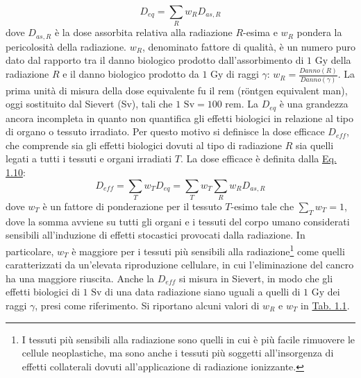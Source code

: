 \documentclass[12pt,a4paper,twoside]{report}
\begin{document}
	\begin{equation}
		D_{eq}=\sum_{R}w_RD_{as,R}
		\label{eq:dose_eq}
	\end{equation}
	dove $D_{as,R}$ è la dose assorbita relativa alla radiazione $R$-esima e $w_R$ pondera la pericolosità della radiazione. $w_R$, denominato fattore di qualità, è un numero puro dato dal rapporto tra il danno biologico prodotto dall'assorbimento di $1\mbox{ Gy}$ della radiazione $R$ e il danno biologico prodotto da $1\mbox{ Gy}$ di raggi $\gamma$: $w_R=\frac{Danno(R)}{Danno(\gamma)}$. La prima unità di misura della dose equivalente fu il rem (röntgen equivalent man), oggi sostituito dal Sievert (Sv), tali che $1\mbox{ Sv}=100\mbox{ rem}$. La $D_{eq}$ è una grandezza ancora incompleta in quanto non quantifica gli effetti biologici in relazione al tipo di organo o tessuto irradiato. Per questo motivo si definisce la dose efficace $D_{eff}$, che comprende sia gli effetti biologici dovuti al tipo di radiazione $R$ sia quelli legati a tutti i tessuti e organi irradiati $T$. La dose efficace è definita dalla \hyperref[eq:dose_eff]{Eq. 1.10}:
	\begin{equation}
		D_{eff}=\sum_{T}w_TD_{eq}=\sum_{T}w_T\sum_{R}w_RD_{as,R}
		\label{eq:dose_eff}
	\end{equation}
	dove $w_T$ è un fattore di ponderazione per il tessuto $T$-esimo tale che $\sum_{T}w_T=1$, dove la somma avviene su tutti gli organi e i tessuti del corpo umano considerati sensibili all'induzione di effetti stocastici provocati dalla radiazione. In particolare, $w_T$ è maggiore per i tessuti più sensibili alla radiazione\footnote{I tessuti più sensibili alla radiazione sono quelli in cui è più facile rimuovere le cellule neoplastiche, ma sono anche i tessuti più soggetti all'insorgenza di effetti collaterali dovuti all'applicazione di radiazione ionizzante.} come quelli caratterizzati da un'elevata riproduzione cellulare, in cui l'eliminazione del cancro ha una maggiore riuscita. Anche la $D_{eff}$ si misura in Sievert, in modo che gli effetti biologici di $1\mbox{ Sv}$ di una data radiazione siano uguali a quelli di $1\mbox{ Gy}$ dei raggi $\gamma$, presi come riferimento. Si riportano alcuni valori di $w_R$ e $w_T$ in \hyperref[tab:w_factor]{Tab. 1.1}.
\end{document}
